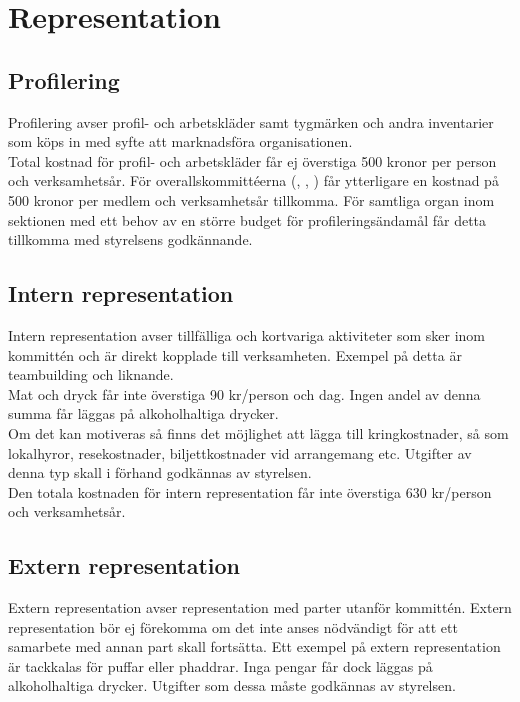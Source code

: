 \documentclass[11pt, includeaddress]{classes/cthit}
\begin{document}
\section{Representation}

\subsection{Profilering}
Profilering avser profil- och arbetskläder samt tygmärken och andra inventarier som köps in med syfte att marknadsföra organisationen. \\

Total kostnad för profil- och arbetskläder får ej överstiga 500 kronor per person och verksamhetsår. För overallskommittéerna (\NOLLKIT{}, \PRIT{}, \SEXIT{}) får ytterligare en kostnad på 500 kronor per medlem och verksamhetsår tillkomma. För samtliga organ inom sektionen med ett behov av en större budget för profileringsändamål får detta tillkomma med styrelsens godkännande.

\subsection{Intern representation}
Intern representation avser tillfälliga och kortvariga aktiviteter som sker inom kommittén och är direkt kopplade till verksamheten. Exempel på detta är teambuilding och liknande. \\

Mat och dryck får inte överstiga 90 kr/person och dag. Ingen andel av denna summa får läggas på alkoholhaltiga drycker. \\

Om det kan motiveras så finns det möjlighet att lägga till kringkostnader, så som lokalhyror, resekostnader, biljettkostnader vid arrangemang etc. Utgifter av denna typ skall i förhand godkännas av styrelsen. \\

Den totala kostnaden för intern representation får inte överstiga 630 kr/person och verksamhetsår.

\subsection{Extern representation}
Extern representation avser representation med parter utanför kommittén. Extern representation bör ej förekomma om det inte anses nödvändigt för att ett samarbete med annan part skall fortsätta. Ett exempel på extern representation är tackkalas för puffar eller phaddrar. Inga pengar får dock läggas på alkoholhaltiga drycker. Utgifter som dessa måste godkännas av styrelsen.
\end{document}
